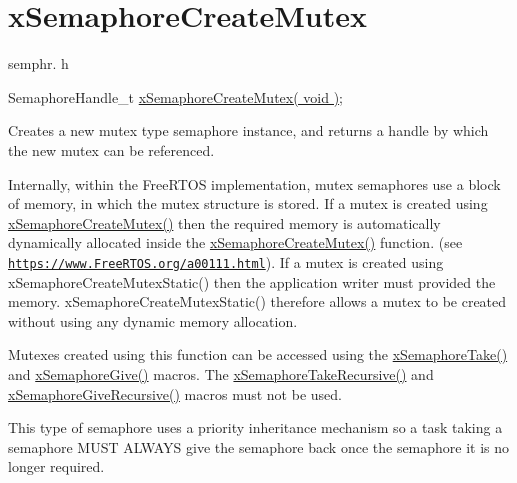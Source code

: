 \hypertarget{group__x_semaphore_create_mutex}{}\section{x\+Semaphore\+Create\+Mutex}
\label{group__x_semaphore_create_mutex}
semphr. h 
\begin{DoxyPre}
SemaphoreHandle\_t \hyperlink{vendor_2ceedling_2plugins_2freertos_2src_2freertos_2include_2semphr_8h_aa6a00aa9b91a9e5b3ebe4ae1c3f115c6}{xSemaphoreCreateMutex( void )};
\end{DoxyPre}


Creates a new mutex type semaphore instance, and returns a handle by which the new mutex can be referenced.

Internally, within the Free\+R\+T\+OS implementation, mutex semaphores use a block of memory, in which the mutex structure is stored. If a mutex is created using \hyperlink{vendor_2ceedling_2plugins_2freertos_2src_2freertos_2include_2semphr_8h_aa6a00aa9b91a9e5b3ebe4ae1c3f115c6}{x\+Semaphore\+Create\+Mutex()} then the required memory is automatically dynamically allocated inside the \hyperlink{vendor_2ceedling_2plugins_2freertos_2src_2freertos_2include_2semphr_8h_aa6a00aa9b91a9e5b3ebe4ae1c3f115c6}{x\+Semaphore\+Create\+Mutex()} function. (see \href{https://www.FreeRTOS.org/a00111.html}{\tt https\+://www.\+Free\+R\+T\+O\+S.\+org/a00111.\+html}). If a mutex is created using x\+Semaphore\+Create\+Mutex\+Static() then the application writer must provided the memory. x\+Semaphore\+Create\+Mutex\+Static() therefore allows a mutex to be created without using any dynamic memory allocation.

Mutexes created using this function can be accessed using the \hyperlink{externals_2freertos_2include_2semphr_8h_af116e436d2a5ae5bd72dbade2b5ea930}{x\+Semaphore\+Take()} and \hyperlink{externals_2freertos_2include_2semphr_8h_aae55761cabfa9bf85c8f4430f78c0953}{x\+Semaphore\+Give()} macros. The \hyperlink{vendor_2ceedling_2plugins_2freertos_2src_2freertos_2include_2semphr_8h_ad395f4bba51eea6af3397d72bc079e4d}{x\+Semaphore\+Take\+Recursive()} and \hyperlink{vendor_2ceedling_2plugins_2freertos_2src_2freertos_2include_2semphr_8h_a398d66b17856c22dd49d39aaac42f105}{x\+Semaphore\+Give\+Recursive()} macros must not be used.

This type of semaphore uses a priority inheritance mechanism so a task \textquotesingle{}taking\textquotesingle{} a semaphore M\+U\+ST A\+L\+W\+A\+YS \textquotesingle{}give\textquotesingle{} the semaphore back once the semaphore it is no longer required.

